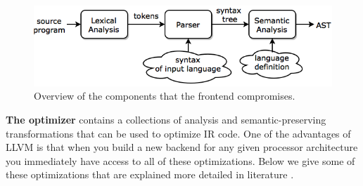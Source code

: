 \begin{figure}[b!]
\centering
\includegraphics[width=.7\textwidth]{figures/frontend}
\caption{Overview of the components that the frontend compromises.}
\label{fig:frontend}
\end{figure}

\textbf{The optimizer} contains a collections of analysis and semantic-preserving transformations that can be used to optimize IR code. One of the advantages of LLVM is that when you build a new backend for any given processor architecture you immediately have access to all of these optimizations. Below we give some of these optimizations that are explained more detailed in literature \cite[Chapter~9]{dragon_book}.%
